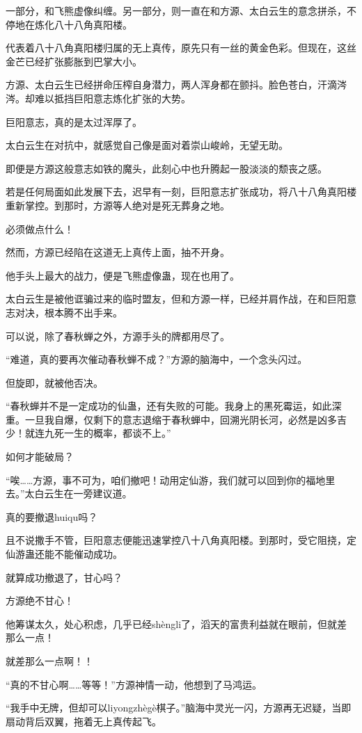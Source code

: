 \begin{this_body}
一部分，和飞熊虚像纠缠。另一部分，则一直在和方源、太白云生的意念拼杀，不停地在炼化八十八角真阳楼。

代表着八十八角真阳楼归属的无上真传，原先只有一丝的黄金色彩。但现在，这丝金芒已经扩张膨胀到巴掌大小。

方源、太白云生已经拼命压榨自身潜力，两人浑身都在颤抖。脸色苍白，汗滴涔涔。却难以抵挡巨阳意志炼化扩张的大势。

巨阳意志，真的是太过浑厚了。

太白云生在对抗中，就感觉自己像是面对着崇山峻岭，无望无助。

即便是方源这般意志如铁的魔头，此刻心中也升腾起一股淡淡的颓丧之感。

若是任何局面如此发展下去，迟早有一刻，巨阳意志扩张成功，将八十八角真阳楼重新掌控。到那时，方源等人绝对是死无葬身之地。

必须做点什么！

然而，方源已经陷在这道无上真传上面，抽不开身。

他手头上最大的战力，便是飞熊虚像蛊，现在也用了。

太白云生是被他诓骗过来的临时盟友，但和方源一样，已经并肩作战，在和巨阳意志对决，根本腾不出手来。

可以说，除了春秋蝉之外，方源手头的牌都用尽了。

“难道，真的要再次催动春秋蝉不成？”方源的脑海中，一个念头闪过。

但旋即，就被他否决。

“春秋蝉并不是一定成功的仙蛊，还有失败的可能。我身上的黑死霉运，如此深重。一旦我自爆，仅剩下的意志退缩于春秋蝉中，回溯光阴长河，必然是凶多吉少！就连九死一生的概率，都谈不上。”

如何才能破局？

“唉……方源，事不可为，咱们撤吧！动用定仙游，我们就可以回到你的福地里去。”太白云生在一旁建议道。

真的要撤退huiqu吗？

且不说撒手不管，巨阳意志便能迅速掌控八十八角真阳楼。到那时，受它阻挠，定仙游蛊还能不能催动成功。

就算成功撤退了，甘心吗？

方源绝不甘心！

他筹谋太久，处心积虑，几乎已经shèngli了，滔天的富贵利益就在眼前，但就差那么一点！

就差那么一点啊！！

“真的不甘心啊……等等！”方源神情一动，他想到了马鸿运。

“我手中无牌，但却可以liyongzhègè棋子。”脑海中灵光一闪，方源再无迟疑，当即扇动背后双翼，拖着无上真传起飞。


\end{this_body}

